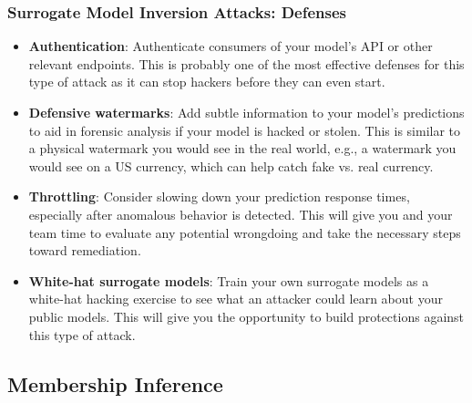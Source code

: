 \documentclass[11pt,
               aspectratio=169,
               hyperref={colorlinks}
               ]{beamer}
\begin{document}
			\begin{frame}[label={slide:inversion_defense}]
		
				\frametitle{Surrogate Model Inversion Attacks: \textbf{Defenses}}
				\begin{itemize}
					\item \textbf{Authentication}: Authenticate consumers of your model’s API or other relevant endpoints. This is probably one of the most effective defenses for this type of attack as it can stop hackers before they can even start.
					\item \textbf{Defensive watermarks}: Add subtle information to your model’s predictions to aid in forensic analysis if your model is hacked or stolen. This is similar to a physical watermark you would see in the real world, e.g., a watermark you would see on a US currency, which can help catch fake vs. real currency.
					\item \textbf{Throttling}: Consider slowing down your prediction response times, especially after anomalous behavior is detected. This will give you and your team time to evaluate any potential wrongdoing and take the necessary steps toward remediation.
					\item \textbf{White-hat surrogate models}: Train your own surrogate models as a white-hat hacking exercise to see what an attacker could learn about your public models. This will give you the opportunity to build protections against this type of attack.
				\end{itemize}
				
			\end{frame}
		

		\subsection{Membership Inference}
\end{document}
